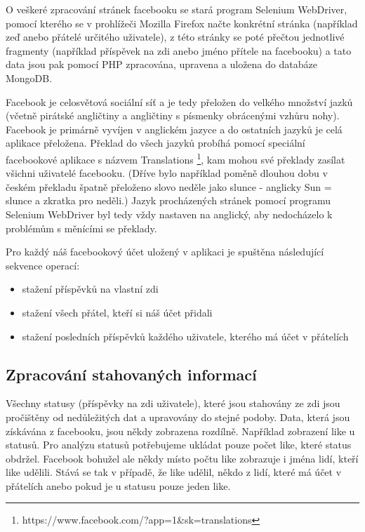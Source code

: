 \documentclass[thesis=M,czech]{FITthesis}[2013/05/10]
\begin{document}
O veškeré zpracování stránek facebooku se stará program Selenium WebDriver, pomocí kterého se v prohlížeči Mozilla Firefox načte konkrétní stránka (například zeď anebo přátelé určitého uživatele), z této stránky se poté přečtou jednotlivé fragmenty (například příspěvek na zdi anebo jméno přítele na facebooku) a tato data jsou pak pomocí PHP zpracována, upravena a uložena do databáze MongoDB. 

Facebook je celosvětová sociální síť a je tedy přeložen do velkého množství jazků (včetně pirátské angličtiny a angličtiny s písmenky obrácenými vzhůru nohy). Facebook je primárně vyvíjen v anglickém jazyce a do ostatních jazyků je celá aplikace přeložena. Překlad do všech jazyků probíhá pomocí speciální facebookové aplikace s názvem Translations \footnote{https://www.facebook.com/?app=1\&sk=translations}, kam mohou své překlady zasílat všichni uživatelé facebooku. (Dříve bylo například poměně dlouhou dobu v českém překladu špatně přeloženo slovo neděle jako slunce - anglicky Sun = slunce a zkratka pro neděli.) Jazyk procházených stránek pomocí programu Selenium WebDriver byl tedy vždy nastaven na anglický, aby nedocházelo k problémům s měnícími se překlady. 

Pro každý náš facebookový účet uložený v aplikaci je spuštěna následující sekvence operací:

\begin{itemize}
  \item stažení příspěvků na vlastní zdi
  \item stažení všech přátel, kteří si náš účet přidali
  \item stažení posledních příspěvků každého uživatele, kterého má účet v přátelích
\end{itemize}

\subsection{Zpracování stahovaných informací}

Všechny statusy (příspěvky na zdi uživatele), které jsou stahovány ze zdi jsou pročištěny od nedůležitých dat a upravovány do stejné podoby. Data, která jsou získávána z facebooku, jsou někdy zobrazena rozdílně. Například zobrazení like u statusů. Pro analýzu statusů potřebujeme ukládat pouze počet like, které status obdržel. Facebook bohužel ale někdy místo počtu like zobrazuje i jména lidí, kteří like udělili. Stává se tak v případě, že like udělil, někdo z lidí, které má účet v přátelích anebo pokud je u statusu pouze jeden like.
\end{document}
